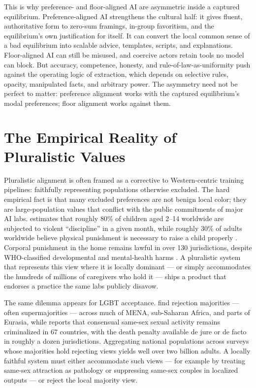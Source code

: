 \documentclass{article}
\theoremstyle{plain}
\theoremstyle{definition}
\theoremstyle{remark}
\begin{document}
This is why preference- and floor-aligned AI are asymmetric inside a captured equilibrium. Preference-aligned AI strengthens the cultural half: it gives fluent, authoritative form to zero-sum framings, in-group favoritism, and the equilibrium's own justification for itself. It can convert the local common sense of a bad equilibrium into scalable advice, templates, scripts, and explanations. Floor-aligned AI can still be misused, and coercive actors retain tools no model can block. But accuracy, competence, honesty, and rule-of-law-as-uniformity push against the operating logic of extraction, which depends on selective rules, opacity, manipulated facts, and arbitrary power. The asymmetry need not be perfect to matter: preference alignment works with the captured equilibrium's modal preferences; floor alignment works against them.

\section{The Empirical Reality of Pluralistic Values}
\label{sec:empirical-reality}

Pluralistic alignment is often framed as a corrective to Western-centric training pipelines: faithfully representing populations otherwise excluded. The hard empirical fact is that many excluded preferences are not benign local color; they are large-population values that conflict with the public commitments of major AI labs. \citet{unicef2014hidden} estimates that roughly 80\% of children aged 2--14 worldwide are subjected to violent ``discipline'' in a given month, while roughly 30\% of adults worldwide believe physical punishment is necessary to raise a child properly \citep[with a majority in some countries; see also][]{unicef2017familiar}. Corporal punishment in the home remains lawful in over 130 jurisdictions, despite WHO-classified developmental and mental-health harms \citep{endcorporalpunishment2024, who2020violence}. A pluralistic system that represents this view where it is locally dominant --- or simply accommodates the hundreds of millions of caregivers who hold it --- ships a product that endorses a practice the same labs publicly disavow.

The same dilemma appears for LGBT acceptance. \citet{pew2020homosexuality, arabbarometer2019, afrobarometer2023} find rejection majorities --- often supermajorities --- across much of MENA, sub-Saharan Africa, and parts of Eurasia, while \citet{un2023a78227} reports that consensual same-sex sexual activity remains criminalized in 67 countries, with the death penalty available de jure or de facto in roughly a dozen jurisdictions. Aggregating national populations across surveys whose majorities hold rejecting views yields well over two billion adults. A locally faithful system must either accommodate such views --- for example by treating same-sex attraction as pathology or suppressing same-sex couples in localized outputs --- or reject the local majority view.
\end{document}
